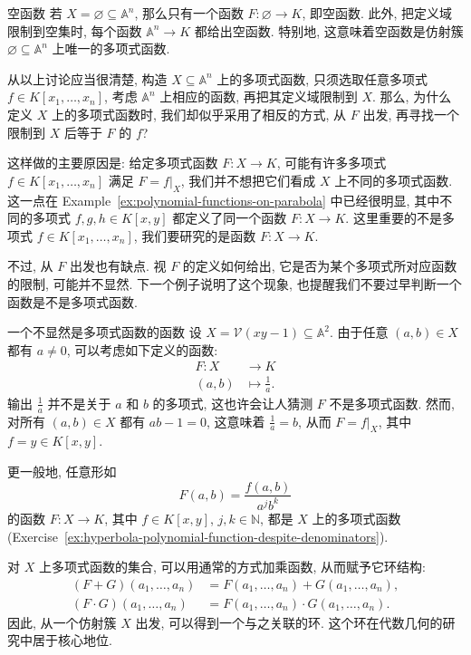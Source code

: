 \begin{Example}{空函数}\leavevmode\label{ex:empty-polynomial-function}
  若 $X=\varnothing\subseteq\mathbb{A}^{n}$, 那么只有一个函数 $F:\varnothing\to K$, 即空函数. 此外, 把定义域限制到空集时, 每个函数 $\mathbb{A}^{n}\to K$ 都给出空函数. 特别地, 这意味着空函数是仿射簇 $\varnothing\subseteq\mathbb{A}^{n}$ 上唯一的多项式函数.
\end{Example}

从以上讨论应当很清楚, 构造 $X\subseteq\mathbb{A}^{n}$ 上的多项式函数, 只须选取任意多项式 $f\in K[x_{1},\ldots,x_{n}]$, 考虑 $\mathbb{A}^{n}$ 上相应的函数, 再把其定义域限制到 $X$. 那么, 为什么定义 $X$ 上的多项式函数时, 我们却似乎采用了相反的方式, 从 $F$ 出发, 再寻找一个限制到 $X$ 后等于 $F$ 的 $f$?

这样做的主要原因是: 给定多项式函数 $F:X\to K$, 可能有许多多项式 $f\in K[x_{1},\ldots,x_{n}]$ 满足 $F=f|_{X}$, 我们并不想把它们看成 $X$ 上不同的多项式函数. 这一点在 Example~\ref{ex:polynomial-functions-on-parabola} 中已经很明显, 其中不同的多项式 $f,g,h\in K[x,y]$ 都定义了同一个函数 $F:X\to K$. 这里重要的不是多项式 $f\in K[x_{1},\ldots,x_{n}]$, 我们要研究的是函数 $F:X\to K$.

不过, 从 $F$ 出发也有缺点. 视 $F$ 的定义如何给出, 它是否为某个多项式所对应函数的限制, 可能并不显然. 下一个例子说明了这个现象, 也提醒我们不要过早判断一个函数是不是多项式函数.

\begin{Example}{一个不显然是多项式函数的函数}\leavevmode\label{ex:apparently-nonpolynomial-hyperbola-function}
  设 $X=\mathcal{V}(xy-1)\subseteq\mathbb{A}^{2}$. 由于任意 $(a,b)\in X$ 都有 $a\ne0$, 可以考虑如下定义的函数:
  \[
    \begin{aligned}
      F:X&\to K\\
      (a,b)&\mapsto\frac{1}{a}.
    \end{aligned}
  \]
  输出 $\frac{1}{a}$ 并不是关于 $a$ 和 $b$ 的多项式, 这也许会让人猜测 $F$ 不是多项式函数. 然而, 对所有 $(a,b)\in X$ 都有 $ab-1=0$, 这意味着 $\frac{1}{a}=b$, 从而 $F=f|_{X}$, 其中 $f=y\in K[x,y]$.

  更一般地, 任意形如
  \[
    F(a,b)=\frac{f(a,b)}{a^{j}b^{k}}
  \]
  的函数 $F:X\to K$, 其中 $f\in K[x,y]$, $j,k\in\mathbb{N}$, 都是 $X$ 上的多项式函数 (Exercise~\ref{ex:hyperbola-polynomial-function-despite-denominators}).
\end{Example}

对 $X$ 上多项式函数的集合, 可以用通常的方式加乘函数, 从而赋予它环结构:
\[
  \begin{aligned}
    (F+G)(a_{1},\ldots,a_{n})&=F(a_{1},\ldots,a_{n})+G(a_{1},\ldots,a_{n}),\\
    (F\cdot G)(a_{1},\ldots,a_{n})&=F(a_{1},\ldots,a_{n})\cdot G(a_{1},\ldots,a_{n}).
  \end{aligned}
\]
因此, 从一个仿射簇 $X$ 出发, 可以得到一个与之关联的环. 这个环在代数几何的研究中居于核心地位.

